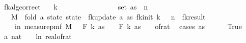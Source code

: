 \begin{isabellebody}
\endisatagproof
{\isafoldproof}%
%
\isadelimproof
\isanewline
%
\endisadelimproof
\isanewline
{}\isamarkupfalse%
\ fk{\isacharunderscore}{\kern0pt}alg{\isacharunderscore}{\kern0pt}correct{\isacharcolon}{\kern0pt}\isanewline
\ \ \ {\isachardoublequoteopen}k\ {\isasymge}\ {}{\isachardoublequoteclose}\isanewline
\ \ \ {\isachardoublequoteopen}{\isasymepsilon}\ {\isasymin}\ {\isacharbraceleft}{\kern0pt}{}{\isacharless}{\kern0pt}{\isachardot}{\kern0pt}{\isachardot}{\kern0pt}{\isacharless}{\kern0pt}{}{\isacharbraceright}{\kern0pt}{\isachardoublequoteclose}\isanewline
\ \ \ {\isachardoublequoteopen}{\isasymdelta}\ {\isachargreater}{\kern0pt}\ {}{\isachardoublequoteclose}\isanewline
\ \ \ {\isachardoublequoteopen}set\ as\ {\isasymsubseteq}\ {\isacharbraceleft}{\kern0pt}{}{\isachardot}{\kern0pt}{\isachardot}{\kern0pt}{\isacharless}{\kern0pt}n{\isacharbraceright}{\kern0pt}{\isachardoublequoteclose}\isanewline
\ \ \ {\isachardoublequoteopen}M\ {\isasymequiv}\ fold\ {\isacharparenleft}{\kern0pt}{\isasymlambda}a\ state{\isachardot}{\kern0pt}\ state\ {\isasymbind}\ fk{\isacharunderscore}{\kern0pt}update\ a{\isacharparenright}{\kern0pt}\ as\ {\isacharparenleft}{\kern0pt}fk{\isacharunderscore}{\kern0pt}init\ k\ {\isasymdelta}\ {\isasymepsilon}\ n{\isacharparenright}{\kern0pt}\ {\isasymbind}\ fk{\isacharunderscore}{\kern0pt}result{\isachardoublequoteclose}\isanewline
\ \ \ {\isachardoublequoteopen}{\isasymP}{\isacharparenleft}{\kern0pt}{\isasymomega}\ in\ measure{\isacharunderscore}{\kern0pt}pmf\ M{\isachardot}{\kern0pt}\ {\isasymbar}{\isasymomega}\ {\isacharminus}{\kern0pt}\ F\ k\ as{\isasymbar}\ {\isasymle}\ {\isasymdelta}\ {\isacharasterisk}{\kern0pt}\ F\ k\ as{\isacharparenright}{\kern0pt}\ {\isasymge}\ {}\ {\isacharminus}{\kern0pt}\ of{\isacharunderscore}{\kern0pt}rat\ {\isasymepsilon}{\isachardoublequoteclose}\isanewline
%
\isadelimproof
%
\endisadelimproof
%
\isatagproof
{}\isamarkupfalse%
\ {\isacharparenleft}{\kern0pt}cases\ {\isachardoublequoteopen}as\ {\isacharequal}{\kern0pt}\ {\isacharbrackleft}{\kern0pt}{\isacharbrackright}{\kern0pt}{\isachardoublequoteclose}{\isacharparenright}{\kern0pt}\isanewline
\ \ \isamarkupfalse%
\ True\isanewline
\ \ \isamarkupfalse%
\ a{\isacharcolon}{\kern0pt}\ {\isachardoublequoteopen}nat\ {\isasymlceil}{\isacharminus}{\kern0pt}\ {\isacharparenleft}{\kern0pt}{}{}\ {\isacharasterisk}{\kern0pt}\ ln\ {\isacharparenleft}{\kern0pt}real{\isacharunderscore}{\kern0pt}of{\isacharunderscore}{\kern0pt}rat\ {\isasymepsilon}{\isacharparenright}{\kern0pt}{\isacharparenright}{\kern0pt}{\isasymrceil}\ {\isachargreater}{\kern0pt}\ {}{\isachardoublequoteclose}\ \ \isamarkupfalse%

\end{isabellebody}
